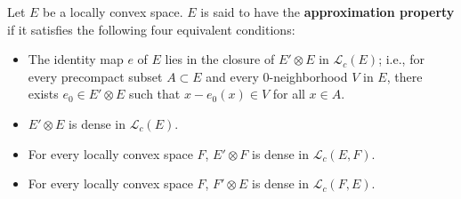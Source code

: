 Let $E$ be a locally convex space. $E$ is said to have the \textbf{approximation property} if it satisfies the following four equivalent conditions:

\begin{itemize}
\item[(a)] The identity map $e$ of $E$ lies in the closure of $E' \otimes E$ in $\mathcal{L}_c(E)$; i.e., for every precompact subset $A \subset E$ and every 0-neighborhood $V$ in $E$, there exists $e_0 \in E' \otimes E$ such that $x - e_0(x) \in V$ for all $x \in A$.

\item[(b)] $E' \otimes E$ is dense in $\mathcal{L}_c(E)$.

\item[(c)] For every locally convex space $F$, $E' \otimes F$ is dense in $\mathcal{L}_c(E, F)$.

\item[(d)] For every locally convex space $F$, $F' \otimes E$ is dense in $\mathcal{L}_c(F, E)$.
\end{itemize}
